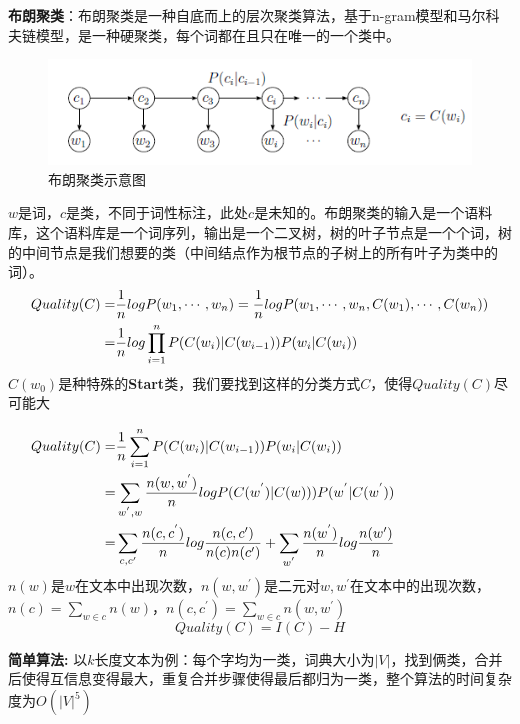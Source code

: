\documentclass[12pt,a4paper]{article}
\begin{document}
\textbf{布朗聚类}：布朗聚类是一种自底而上的层次聚类算法，基于n-gram模型和马尔科夫链模型，是一种硬聚类，每个词都在且只在唯一的一个类中\cite{derczynski2015tune}。

\begin{figure}
  \centering
  \includegraphics[width=0.8\linewidth]{./figures/brown_clustering.png}
  \caption{布朗聚类示意图}\label{fig:brown}
\end{figure}

$w$是词，$c$是类，不同于词性标注，此处$c$是未知的。布朗聚类的输入是一个语料库，这个语料库是一个词序列，输出是一个二叉树，树的叶子节点是一个个词，树的中间节点是我们想要的类（中间结点作为根节点的子树上的所有叶子为类中的词）。
\begin{equation}
\begin{split}
Quality(C)=&\frac{1}{n}logP(w_1,\cdots,w_n) =\frac{1}{n}logP(w_1,\cdots,w_n,C(w_1),\cdots,C(w_n))\\
=&\frac{1}{n}log\prod_{i=1}^{n}P(C(w_i)|C(w_{i-1}))P(w_i|C(w_i))\hspace{1.8cm}
\end{split}
\end{equation}
$C(w_0)$是种特殊的\textbf{Start}类，我们要找到这样的分类方式$C$，使得$Quality(C)$尽可能大

\begin{equation}
\begin{split}
Quality(C)=&\frac{1}{n}\sum_{i=1}^{n}P(C(w_i)|C(w_{i-1}))P(w_i|C(w_i))\hspace{3.7cm}\\
=&\sum_{w^{'},w}\frac{n(w,w^{'})}{n}logP(C(w^{'})|C(w)))P(w^{'}|C(w^{'}))\\
=&\sum_{c,c{'}}\frac{n(c,c^{'})}{n}log\frac{n(c,c{'})}{n(c)n(c')}+\sum_{w^{'}} \frac {n(w^{'})}{n}log\frac{n(w')}{n}
\end{split}
\end{equation}
$n(w)$是$w$在文本中出现次数，$n(w,w^{'})$是二元对$w,w^{'}$在文本中的出现次数，$n(c)=\sum_{w\in c}n(w)$，$n(c,c^{'})=\sum_{w\in c}n(w,w^{'})$		
\begin{equation}
  Quality(C) = I(C)-H
\end{equation}


\textbf{简单算法:} 以$k$长度文本为例：每个字均为一类，词典大小为$|V|$，找到俩类，合并后使得互信息变得最大，重复合并步骤使得最后都归为一类，整个算法的时间复杂度为$O(|V|^{5})$
\end{document}
